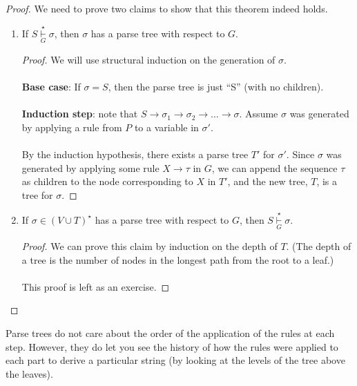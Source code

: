 \documentclass[]{article}
\theoremstyle{definition}
\newcommand{\lecture}[1]{\marginpar{{\footnotesize $\leftarrow$ \underline{#1}}}}
\begin{document}
      \begin{proof}
        We need to prove two claims to show that this theorem indeed holds.
        \begin{enumerate}
          \item If $S \underset{G}{\overset{\star}{\vdash}} \sigma$, then $\sigma$ has a parse tree with respect to $G$.

          \begin{proof}
            We will use structural induction on the generation of $\sigma$.
            \\ \\
            \textbf{Base case}: If $\sigma = S$, then the parse tree is just ``S'' (with no children).
            \\ \\
            \textbf{Induction step}: note that $S \to \sigma_1 \to \sigma_2 \to \ldots \to \sigma$. Assume $\sigma$ was generated by applying a rule from $P$ to a variable in $\sigma'$.
            \\ \\
            By the induction hypothesis, there exists a parse tree $T'$ for $\sigma'$. Since $\sigma$ was generated by applying some rule $X \to \tau$ in $G$, we can append the sequence $\tau$ as children to the node corresponding to $X$ in $T'$, and the new tree, $T$, is a tree for $\sigma$.
          \end{proof}

          \item If $\sigma \in (V \cup T)^\star$ has a parse tree with respect to $G$, then $S \underset{G}{\overset{\star}{\vdash}} \sigma$.

          \begin{proof}
            We can prove this claim by induction on the depth of $T$. (The depth of a tree is the number of nodes in the longest path from the root to a leaf.)
            \\ \\
            This proof is left as an exercise.
          \end{proof}
        \end{enumerate}
      \end{proof}

      \lecture{October 17, 2013}
      Parse trees do not care about the order of the application of the rules at each step. However, they do let you see the history of how the rules were applied to each part to derive a particular string (by looking at the levels of the tree above the leaves).
\end{document}
